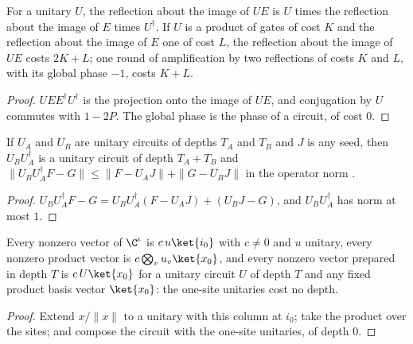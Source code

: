 \begin{theorem}
    \label{thm:unitary_image_reflection}
    \leanok
    For a unitary $U$, the reflection about the image of $UE$ is $U$ times the reflection
    about the image of $E$ times $U^\dagger$. If $U$ is a product of gates of cost $K$ and the
    reflection about the image of $E$ one of cost $L$, the reflection about the image of $UE$
    costs $2K+L$; one round of amplification by two reflections of costs $K$ and $L$, with its
    global phase $-1$, costs $K+L$.
\end{theorem}
\begin{proof}\leanok
    $UEE^\dagger U^\dagger$ is the projection onto the image of $UE$, and conjugation by $U$
    commutes with $1-2P$. The global phase is the phase of a circuit, of cost $0$.
\end{proof}

\begin{theorem}
    \label{thm:unitary_encoder_conversion}
    \leanok
    If $U_A$ and $U_B$ are unitary circuits of depths $T_A$ and $T_B$ and $J$ is any seed,
    then $U_BU_A^\dagger$ is a unitary circuit of depth $T_A+T_B$ and
    $\|U_BU_A^\dagger F-G\|\le\|F-U_AJ\|+\|G-U_BJ\|$ in the operator norm
    \cite{Malz2024Preparation}.
\end{theorem}
\begin{proof}\leanok
    $U_BU_A^\dagger F-G=U_BU_A^\dagger(F-U_AJ)+(U_BJ-G)$, and $U_BU_A^\dagger$ has norm at
    most $1$.
\end{proof}

\begin{theorem}
    \label{thm:unitary_preparation_basis}
    \leanok
    Every nonzero vector of $\C^\iota$ is $c\,u\ket{i_0}$ with $c\ne0$ and $u$ unitary, every
    nonzero product vector is $c\bigotimes_vu_v\ket{x_0}$, and every nonzero vector prepared
    in depth $T$ is $c\,U\ket{x_0}$ for a unitary circuit $U$ of depth $T$ and any fixed
    product basis vector $\ket{x_0}$: the one-site unitaries cost no depth.
\end{theorem}
\begin{proof}\leanok
    Extend $x/\|x\|$ to a unitary with this column at $i_0$; take the product over the sites;
    and compose the circuit with the one-site unitaries, of depth $0$.
\end{proof}
